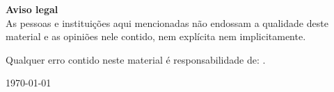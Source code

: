 \textbf{Aviso legal}
\\
\noindent
As pessoas e instituições aqui mencionadas não endossam a qualidade deste material e as opiniões nele contido, nem explícita nem implicitamente.

\noindent
Qualquer erro contido neste material é responsabilidade de: \myauthor.

\vspace{1em}

\hfill
\today

\vfill
\vfill

\thispagestyle{empty}

\cleardoublepage



%
%
%
%
%
%
%
%
%
%
%
%
%
%
%
%
%
%

